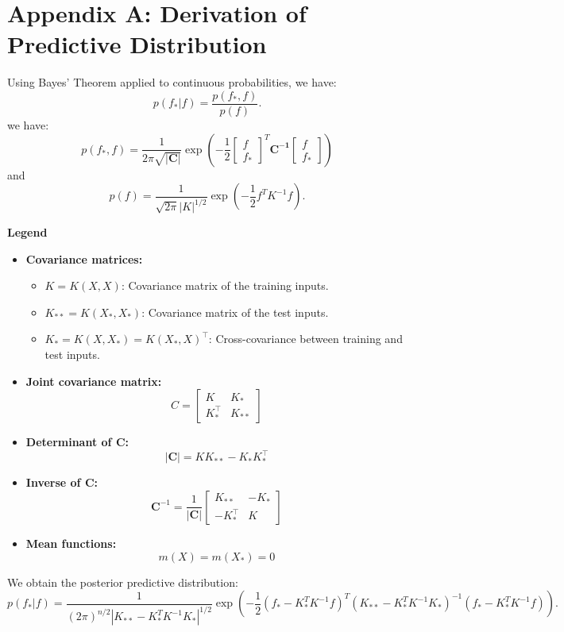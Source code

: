 \documentclass{article}
\begin{document}
\appendix

\section{Appendix A: Derivation of Predictive Distribution}
\label{appendix:A}
Using Bayes' Theorem applied to continuous probabilities, we have:
\[
p(f_* | f) = \frac{p(f_*, f)}{p(f)}.
\]
we have:
$$p(f_*,f) = \frac{1}{2\pi\sqrt{\mathbf{|C|}}}\exp \left(-\frac{1}{2} 
\begin{bmatrix} f \\ f_*  \end{bmatrix}^T\mathbf{C^{-1}}\begin{bmatrix} f  \\ f_* \end{bmatrix}\right)$$
and 
\[
p(f) = \frac{1}{\sqrt{2\pi} |K|^{1/2}}
\exp \left(-\frac{1}{2} f^T K^{-1} f \right).
\]

\noindent
\textbf{Legend}
\begin{itemize}
    \item \textbf{Covariance matrices:}
    \begin{itemize}
        \item \( K = K(X, X) \): Covariance matrix of the training inputs.
        \item \( K_{**} = K(X_*, X_*) \): Covariance matrix of the test inputs.
        \item \( K_* = K(X, X_*) = K(X_*, X)^\top \): Cross-covariance between training and test inputs.
    \end{itemize}
    
    \item \textbf{Joint covariance matrix:}
    \[
    C = \begin{bmatrix}
    K & K_* \\
    K_*^\top & K_{**}
    \end{bmatrix}
    \]
    
    \item \textbf{Determinant of \( \mathbf{C} \):}
    \[
    |\mathbf{C}| = K K_{**} - K_* K_*^\top
    \]
    
    \item \textbf{Inverse of \( \mathbf{C} \):}
    \[
    \mathbf{C}^{-1} = \frac{1}{|\mathbf{C}|}
    \begin{bmatrix}
    K_{**} & -K_* \\
    -K_*^\top & K
    \end{bmatrix}
    \]
    
    \item \textbf{Mean functions:}
    \[
    m(X) = m(X_*) = 0
    \]
\end{itemize}


\noindent
We obtain the posterior predictive distribution:
\begin{equation}\label{eq: 1}
p(f_* | f) = \frac{1}{(2\pi)^{n/2} |K_{**} - K_*^T K^{-1} K_*|^{1/2}} 
\exp \left( 
-\frac{1}{2} 
(f_* - K_*^T K^{-1} f)^T 
(K_{**} - K_*^T K^{-1} K_*)^{-1} 
(f_* - K_*^T K^{-1} f) 
\right).
\end{equation}



% 
% 
 
\end{document}
